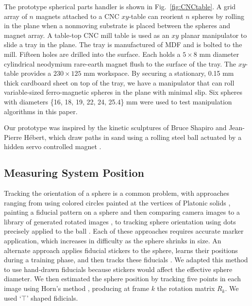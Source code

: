 \documentclass[letter paper, 10pt, conference]{ieeeconf}
\begin{document}
    The prototype spherical parts handler is shown in Fig.~\ref{fig:CNCtable}.  
A grid array of $n$ magnets attached to a CNC $xy$-table can reorient $n$ spheres by rolling in the plane when a nonmoving substrate is placed between the spheres and magnet array.  A table-top CNC mill table is used as an $xy$ planar manipulator to slide a tray in the plane.  The tray is manufactured of MDF and is bolted to the mill.  Fifteen holes are drilled into the surface. Each holds a $5\times8$ mm diameter cylindrical neodymium rare-earth magnet flush to the surface of the tray. The $xy$-table provides a $230\times125$ mm workspace. By securing a stationary,  0.15 mm thick cardboard sheet on top of the tray, we have a manipulator that can roll variable-sized ferro-magnetic spheres in the plane with minimal slip. Six spheres with diameters \{16, 18, 19, 22, 24, 25.4\} mm  were used to test manipulation algorithms in this paper. 

 Our prototype was inspired by the kinetic sculptures of Bruce Shapiro and Jean-Pierre H{\'e}bert, which draw paths in sand using a rolling steel ball actuated by a hidden servo controlled magnet \cite{Shapiro1998,Hebert1999}.



    

\subsection{Measuring System Position}
   Tracking the orientation of a sphere is a common problem, with approaches ranging from 
     using colored circles painted at the vertices of Platonic solids \cite{Lynch2001},
   painting a fiducial pattern on a sphere and then comparing camera images to a library of generated rotated images \cite{Robert-Zimmermann2011}, to tracking sphere orientation using dots precisely applied to the ball  \cite{Bradley2004}.  Each of these approaches requires accurate marker application, which increases in difficulty as the sphere shrinks in size.  An alternate approach applies fiducial stickers to the sphere, learns their positions during a training phase, and then tracks these fiducials \cite{Beeler2010}.  We adapted this method to use hand-drawn fiducials because stickers would affect the effective sphere diameter.  We then estimated the sphere position by tracking five points in each image using Horn's method \cite{Horn1987}, producing at frame $k$ the rotation matrix $R_k$.  We used `$\top$' shaped fidicials. %
\end{document}
